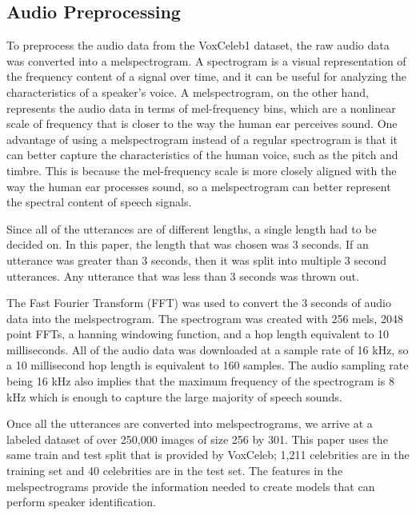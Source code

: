 \documentclass{article}
\begin{document}
\subsection{Audio Preprocessing}
To preprocess the audio data from the VoxCeleb1 dataset, the raw audio data was converted into a melspectrogram. A 
spectrogram is a visual representation of the frequency content of a signal over time, and it can be useful for 
analyzing the characteristics of a speaker's voice. A melspectrogram, on the other hand, represents the audio data in 
terms of mel-frequency bins, which are a nonlinear scale of frequency that is closer to the way the human ear perceives 
sound. One advantage of using a melspectrogram instead of a regular spectrogram is that it can better capture the 
characteristics of the human voice, such as the pitch and timbre. This is because the mel-frequency scale is more closely 
aligned with the way the human ear processes sound, so a melspectrogram can better represent the spectral content of speech signals.

Since all of the utterances are of different lengths, a single length had to be decided on. In this paper, the 
length that was chosen was 3 seconds. If an utterance was greater than 3 seconds, then it was split into multiple 3 
second utterances. Any utterance that was less than 3 seconds was thrown out.

The Fast Fourier Transform (FFT) was used to convert the 3 seconds of audio data into the melspectrogram. The spectrogram
was created with 256 mels, 2048 point FFTs, a hanning windowing function, and a hop length equivalent to 10 milliseconds. 
All of the audio data was downloaded at a sample rate of 16 kHz, so a 10 millisecond hop length is equivalent to 160 
samples. The audio sampling rate being 16 kHz also implies that the maximum frequency of the spectrogram is 8 kHz which 
is enough to capture the large majority of speech sounds.

Once all the utterances are converted into melspectrograms, we arrive at a labeled dataset of over 250,000 images of 
size 256 by 301. This paper uses the same train and test split that is provided by VoxCeleb; 1,211 celebrities are in 
the training set and 40 celebrities are in the test set. The features in the melspectrograms provide the information
needed to create models that can perform speaker identification.

\end{document}
